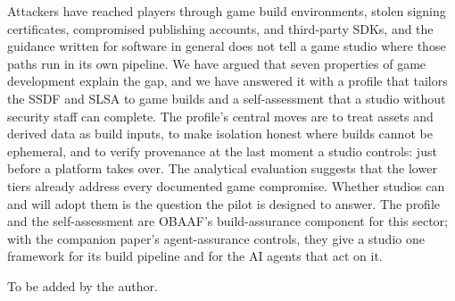 \documentclass[acmsmall,screen,review]{acmart}
\begin{document}
Attackers have reached players through game build environments, stolen signing certificates, compromised publishing accounts, and third-party SDKs, and the guidance written for software in general does not tell a game studio where those paths run in its own pipeline. We have argued that seven properties of game development explain the gap, and we have answered it with a profile that tailors the SSDF and SLSA to game builds and a self-assessment that a studio without security staff can complete. The profile's central moves are to treat assets and derived data as build inputs, to make isolation honest where builds cannot be ephemeral, and to verify provenance at the last moment a studio controls: just before a platform takes over. The analytical evaluation suggests that the lower tiers already address every documented game compromise. Whether studios can and will adopt them is the question the pilot is designed to answer. The profile and the self-assessment are OBAAF's build-assurance component for this sector; with the companion paper's agent-assurance controls, they give a studio one framework for its build pipeline and for the AI agents that act on it.

\begin{acks}
To be added by the author.

\end{acks}



\end{document}
